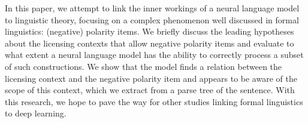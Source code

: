 In this paper, we attempt to link the inner workings of a neural language model to linguistic theory, focusing on a complex phenomenon well discussed in formal linguistics: (negative) polarity items. We briefly discuss the leading hypotheses about the licensing contexts that allow negative polarity items and evaluate to what extent a neural language model has the ability to correctly process a subset of such constructions. We show that the model finds a relation between the licensing context and the negative polarity item and appears to be aware of the scope of this context, which we extract from a parse tree of the sentence. With this research, we hope to pave the way for other studies linking formal linguistics to deep learning.
